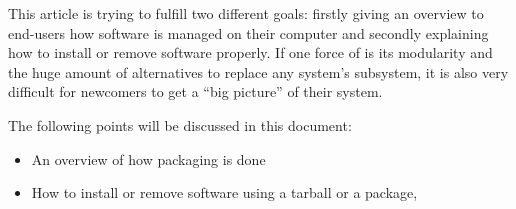 This article is trying to fulfill two different goals: firstly giving
an overview to \linux end-users how software is managed on their
computer and secondly explaining how to install or remove software
properly. If one force of \linux is its modularity and the huge amount
of alternatives to replace any system's subsystem, it is also very
difficult for newcomers to get a ``big picture'' of their system.

The following points will be discussed in this document:
\begin{itemize}
\item An overview of how \linux packaging is done
\item How to install or remove software using a tarball or a package,
\end{itemize}